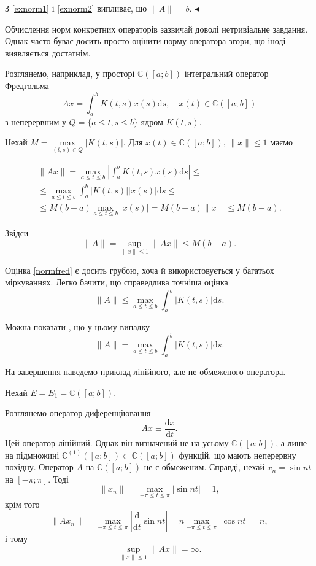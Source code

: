 \documentclass[14pt,twoside]{extreport}
\theoremstyle{mystyle}
\numberwithin{equation}{chapter}
\newcommand{\cab}{\mathbb{C}([a; b])}
\begin{document}
З \eqref{exnorm1} і \eqref{exnorm2} випливає, що $\|A\| = b$.
$\blacktriangleleft$

Обчислення норм конкретних операторів зазвичай доволі нетривіальне завдання. Однак часто буває досить просто оцінити норму оператора згори, що іноді виявляється достатнім.

Розглянемо, наприклад, у просторі $\cab$ інтегральний оператор Фредгольма
\[
 Ax = \int_{a}^{b} K(t, s) x(s) \mathrm{d}s, \quad x(t) \in \cab
\]
з неперервним у $Q=\{a \leqslant t, s \leqslant b\}$ ядром $K(t, s)$.

Нехай $M = \max\limits_{(t,s) \in Q} |K(t, s)|$. Для $x(t) \in \cab$, $\|x\| \leqslant 1$ маємо

\begin{multline*}
  \|Ax\|= \displaystyle\max\limits_{a\leqslant t \leqslant b} \left|\int_{a}^{b} K(t, s) x(s) \mathrm{d}s\right| \leqslant \\
  \displaystyle\leqslant \max\limits_{a\leqslant t \leqslant b} \int_{a}^{b} |K(t, s)| |x(s)| \mathrm{d}s \leqslant \\
  \displaystyle\leqslant M(b-a) \max\limits_{a\leqslant t \leqslant b} |x(s)| = M(b-a) \|x\| \leqslant M(b-a).
\end{multline*}

Звідси
\begin{equation}\label{normfred}
 \|A\| = \sup_{\|x\|\leqslant 1} \|Ax\| \leqslant M(b-a).
\end{equation}

Оцінка \eqref{normfred} є досить грубою, хоча й використовується у багатьох міркуваннях. Легко бачити, що справедлива точніша оцінка
\[
 \|A\| \leqslant \max\limits_{a\leqslant t \leqslant b} \int_{a}^{b} |K(t, s)| \mathrm{d}s.
\]

Можна показати , що у цьому випадку
\[
 \|A\| = \max\limits_{a\leqslant t \leqslant b} \int_{a}^{b} |K(t, s)| \mathrm{d}s.
\]

На завершення наведемо приклад лінійного, але не обмеженого оператора.

Нехай $E = E_1 = \cab$.

Розглянемо оператор диференціювання
\[
 Ax \equiv \frac{\mathrm{d}x}{\mathrm{d}t}.
\]
Цей оператор лінійний. Однак він визначений не на усьому $\cab$, а лише на підмножині $\mathbb{C}^{(1)}([a; b]) \subset \cab$ функцій, що мають неперервну похідну. Оператор $A$ на $\cab$ не є обмеженим. Справді, нехай $x_n = \sin nt$ на $[-\pi; \pi]$. Тоді
\[
 \|x_n\| = \max_{-\pi\leqslant t \leqslant \pi} |\sin nt| = 1,
\]
крім того
\[
 \|Ax_n\| = \max_{-\pi\leqslant t \leqslant \pi} \left|\frac{\mathrm{d}}{\mathrm{d}t} \sin nt\right| = n \max_{-\pi\leqslant t \leqslant \pi} |\cos nt| = n,
\]
і тому
\[
 \sup_{\|x\| \leqslant 1} \|Ax\| = \infty.
\]
\end{document}
